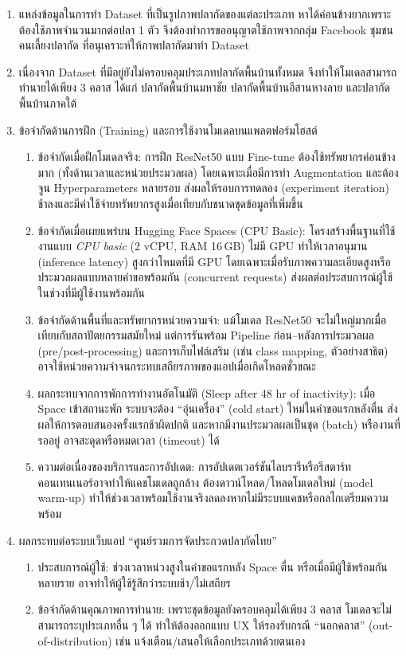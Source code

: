 \begin{sloppypar}
	\begin{enumerate}
		\item แหล่งข้อมูลในการทำ Dataset ที่เป็นรูปภาพปลากัดของแต่ละประเภท หาได้ค่อนข้างยากเพราะ
		ต้องใช้ภาพจำนวนมากต่อปลา 1 ตัว จึงต้องทำการขออนุญาตใช้ภาพจากกลุ่ม Facebook ชุมชน
		คนเลี้ยงปลากัด ที่อนุเคราะห์ให้ภาพปลากัดมาทำ Dataset
		\item เนื่องจาก Dataset ที่มีอยู่ยังไม่ครอบคลุมประเภทปลากัดพื้นบ้านทั้งหมด จึงทำให้โมเดลสามารถทำนายได้เพียง 3 คลาส ได้แก่ ปลากัดพื้นบ้านมหาชัย ปลากัดพื้นบ้านอีสานหางลาย และปลากัดพื้นบ้านภาคใต้
		\item ข้อจำกัดด้านการฝึก (Training) และการใช้งานโมเดลบนแพลตฟอร์มโฮสต์
		\begin{enumerate}
			\item ข้อจำกัดเมื่อฝึกโมเดลจริง: การฝึก ResNet50 แบบ Fine-tune ต้องใช้ทรัพยากรค่อนข้างมาก (ทั้งด้านเวลาและหน่วยประมวลผล) โดยเฉพาะเมื่อมีการทำ Augmentation และต้องจูน Hyperparameters หลายรอบ ส่งผลให้รอบการทดลอง (experiment iteration) ช้าลงและมีค่าใช้จ่ายทรัพยากรสูงเมื่อเทียบกับขนาดชุดข้อมูลที่เพิ่มขึ้น
			\item ข้อจำกัดเมื่อเผยแพร่บน Hugging Face Spaces (CPU Basic): โครงสร้างพื้นฐานที่ใช้งานแบบ \emph{CPU basic} (2 vCPU, RAM 16\,GB) ไม่มี GPU ทำให้เวลาอนุมาน (inference latency) สูงกว่าโหมดที่มี GPU โดยเฉพาะเมื่อรับภาพความละเอียดสูงหรือประมวลผลแบบหลายคำขอพร้อมกัน (concurrent requests) ส่งผลต่อประสบการณ์ผู้ใช้ในช่วงที่มีผู้ใช้งานพร้อมกัน
			\item ข้อจำกัดด้านพื้นที่และทรัพยากรหน่วยความจำ: แม้โมเดล ResNet50 จะไม่ใหญ่มากเมื่อเทียบกับสถาปัตยกรรมสมัยใหม่ แต่การรันพร้อม Pipeline ก่อน–หลังการประมวลผล (pre/post-processing) และการเก็บไฟล์เสริม (เช่น class mapping, ตัวอย่างสาธิต) อาจใช้หน่วยความจำจนกระทบเสถียรภาพของแอปเมื่อเกิดโหลดชั่วขณะ
			\item ผลกระทบจากการพักการทำงานอัตโนมัติ (Sleep after 48 hr of inactivity): เมื่อ Space เข้าสถานะพัก ระบบจะต้อง “อุ่นเครื่อง” (cold start) ใหม่ในคำขอแรกหลังตื่น ส่งผลให้การตอบสนองครั้งแรกช้าผิดปกติ และหากมีงานประมวลผลเป็นชุด (batch) หรืองานที่รออยู่ อาจสะดุดหรือหมดเวลา (timeout) ได้
			\item ความต่อเนื่องของบริการและการอัปเดต: การอัปเดตเวอร์ชันไลบรารีหรือรีสตาร์ทคอนเทนเนอร์อาจทำให้แคชโมเดลถูกล้าง ต้องดาวน์โหลด/โหลดโมเดลใหม่ (model warm-up) ทำให้ช่วงเวลาพร้อมใช้งานจริงลดลงหากไม่มีระบบแคชหรือกลไกเตรียมความพร้อม
		\end{enumerate}
		\item ผลกระทบต่อระบบเว็บแอป “ศูนย์รวมการจัดประกวดปลากัดไทย”
		\begin{enumerate}
			\item ประสบการณ์ผู้ใช้: ช่วงเวลาหน่วงสูงในคำขอแรกหลัง Space ตื่น หรือเมื่อมีผู้ใช้พร้อมกันหลายราย อาจทำให้ผู้ใช้รู้สึกว่าระบบช้า/ไม่เสถียร
			\item ข้อจำกัดด้านคุณภาพการทำนาย: เพราะชุดข้อมูลยังครอบคลุมได้เพียง 3 คลาส โมเดลจะไม่สามารถระบุประเภทอื่น ๆ ได้ ทำให้ต้องออกแบบ UX ให้รองรับกรณี “นอกคลาส” (out-of-distribution) เช่น แจ้งเตือน/เสนอให้เลือกประเภทด้วยตนเอง
		\end{enumerate}
	\end{enumerate}
\end{sloppypar}


